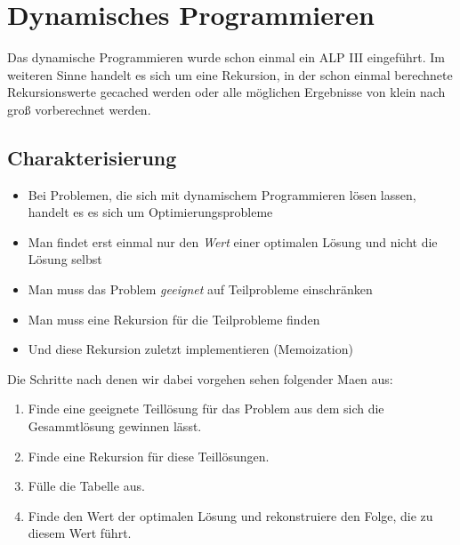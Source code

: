 \section{Dynamisches Programmieren}

Das dynamische Programmieren wurde schon einmal ein ALP III eingeführt. Im weiteren Sinne handelt es sich um eine Rekursion, in der schon einmal berechnete Rekursionswerte gecached werden oder alle möglichen Ergebnisse von klein nach groß vorberechnet werden.

\subsection{Charakterisierung}

\begin{itemize}
\item Bei Problemen, die sich mit dynamischem Programmieren lösen lassen, handelt es es sich um Optimierungsprobleme

\item Man findet erst einmal nur den \emph{Wert} einer optimalen Lösung und nicht die Lösung selbst

\item Man muss das Problem \emph{geeignet} auf Teilprobleme einschränken

\item Man muss eine Rekursion für die Teilprobleme finden

\item Und diese Rekursion zuletzt implementieren (Memoization)
\end{itemize}

Die Schritte nach denen wir dabei vorgehen sehen folgender Maen aus:

\begin{enumerate}

\item Finde eine geeignete Teillösung für das Problem aus dem sich die Gesammtlösung gewinnen lässt.

\item Finde eine Rekursion für diese Teillösungen.

\item Fülle die Tabelle aus.

\item Finde den Wert der optimalen Lösung und rekonstruiere den Folge, die zu diesem Wert führt.

\end{enumerate}

